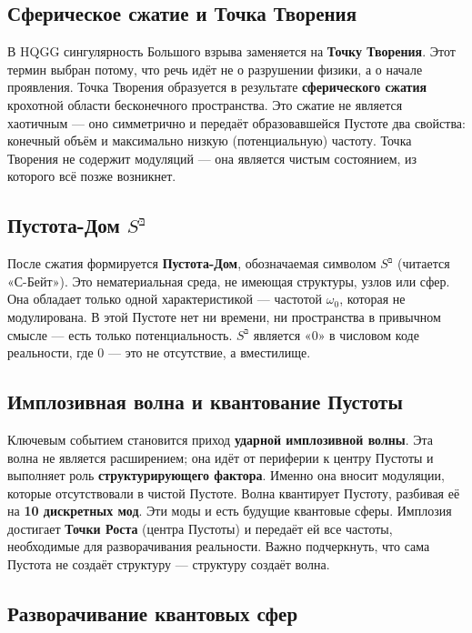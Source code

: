 \documentclass[12pt,a4paper]{article}
\begin{document}
\subsection{Сферическое сжатие и Точка Творения}

В HQGG сингулярность Большого взрыва заменяется на \textbf{Точку Творения}. Этот термин выбран потому, что речь идёт не о разрушении физики, а о начале проявления. Точка Творения образуется в результате \textbf{сферического сжатия} крохотной области бесконечного пространства. Это сжатие не является хаотичным — оно симметрично и передаёт образовавшейся Пустоте два свойства: конечный объём и максимально низкую (потенциальную) частоту. Точка Творения не содержит модуляций — она является чистым состоянием, из которого всё позже возникнет.

\subsection{Пустота-Дом \( S^{\text{בּ}} \)}

После сжатия формируется \textbf{Пустота-Дом}, обозначаемая символом \( S^{\text{בּ}} \) (читается «С-Бейт»). Это нематериальная среда, не имеющая структуры, узлов или сфер. Она обладает только одной характеристикой — частотой \(\omega_0\), которая не модулирована. В этой Пустоте нет ни времени, ни пространства в привычном смысле — есть только потенциальность. \( S^{\text{בּ}} \) является «0» в числовом коде реальности, где 0 — это не отсутствие, а вместилище.

\subsection{Имплозивная волна и квантование Пустоты}

Ключевым событием становится приход \textbf{ударной имплозивной волны}. Эта волна не является расширением; она идёт от периферии к центру Пустоты и выполняет роль \textbf{структурирующего фактора}. Именно она вносит модуляции, которые отсутствовали в чистой Пустоте. Волна квантирует Пустоту, разбивая её на \textbf{10 дискретных мод}. Эти моды и есть будущие квантовые сферы. Имплозия достигает \textbf{Точки Роста} (центра Пустоты) и передаёт ей все частоты, необходимые для разворачивания реальности. Важно подчеркнуть, что сама Пустота не создаёт структуру — структуру создаёт волна.

\subsection{Разворачивание квантовых сфер}
\end{document}
